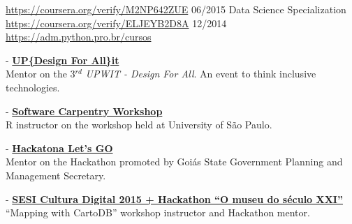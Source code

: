 \documentclass[]{friggeri-cv}
\begin{document}
\begin{entrylist}
{    {\scriptsize{\href{https://coursera.org/verify/M2NP642ZUE}{https://coursera.org/verify/M2NP642ZUE}}}}
  \entry
    {06/2015}
    {Data Science Specialization}
    {}
    {\emph{}\\
    {\scriptsize{\href{https://coursera.org/verify/ELJEYB2D8A}{https://coursera.org/verify/ELJEYB2D8A}}}}
  \entry
    {12/2014}
    {}
    {}
    {\href{https://adm.python.pro.br/cursos}{https://adm.python.pro.br/cursos}}
\end{entrylist}
%
%
\newpage
{}%
%
%
{\footnotesize{}} - \href{https://www.facebook.com/events/1617891821849460/}{\textbf{UP\{Design For All\}it}}\\
           {Mentor on the 3$^{rd}$ \textit{UPWIT - Design For All}. An event to think inclusive technologies}.

{\footnotesize{}} - \href{https://rgaiacs.github.io/2016-05-27-ccsl/}{\textbf{Software Carpentry Workshop}}\\
           {R instructor on the workshop held at University of São Paulo}.

{\footnotesize{}} - \href{http://www.lets.go.gov.br/}{\textbf{Hackatona Let's GO}}\\
           {Mentor on the Hackathon promoted by Goiás State Government Planning and Management Secretary}.

{\footnotesize{}} - \href{http://www.hackagenda.com.br/evento/sesi-cultura-digital-2015-hackathon-o-museu-do-seculo-xxi/}{\textbf{SESI Cultura Digital 2015 + Hackathon “O museu do século XXI”}}\\
           {``Mapping with CartoDB'' workshop instructor and Hackathon mentor}.
\end{document}
